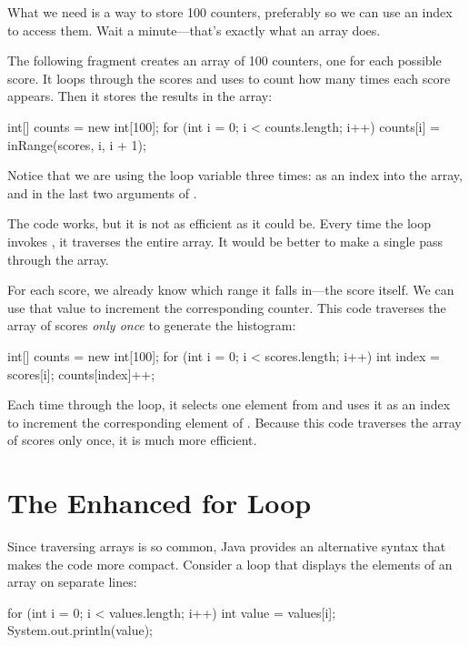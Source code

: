What we need is a way to store 100 counters, preferably so we can use an index to access them.
Wait a minute---that's exactly what an array does.

The following fragment creates an array of 100 counters, one for each possible score.
It loops through the scores and uses  to count how many times each score appears.
Then it stores the results in the  array:

\begin{code}
int[] counts = new int[100];
for (int i = 0; i < counts.length; i++) {
    counts[i] = inRange(scores, i, i + 1);
}
\end{code}

Notice that we are using the loop variable  three times: as an index into the  array, and in the last two arguments of .


The code works, but it is not as efficient as it could be.
Every time the loop invokes , it traverses the entire array.
It would be better to make a single pass through the  array.

For each score, we already know which range it falls in---the score itself.
We can use that value to increment the corresponding counter.
This code traverses the array of scores {\em only once} to generate the histogram:

\begin{code}
int[] counts = new int[100];
for (int i = 0; i < scores.length; i++) {
    int index = scores[i];
    counts[index]++;
}
\end{code}

Each time through the loop, it selects one element from  and uses it as an index to increment the corresponding element of .
Because this code traverses the array of scores only once, it is much more efficient.


\section{The Enhanced for Loop}
\label{enhanced}

Since traversing arrays is so common, Java provides an alternative syntax that makes the code more compact.
Consider a  loop that displays the elements of an array on separate lines:

\begin{code}
for (int i = 0; i < values.length; i++) {
    int value = values[i];
    System.out.println(value);
}
\end{code}

